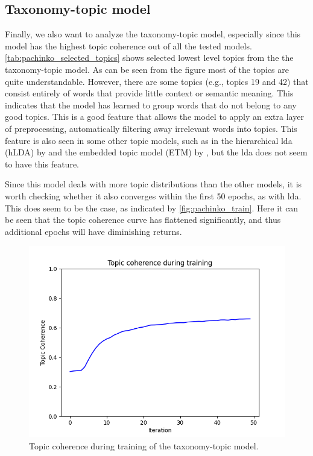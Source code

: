 \subsection{Taxonomy-topic model}\label{sec:taxonomy_analysis}
Finally, we also want to analyze the taxonomy-topic model, especially since this model has the highest topic coherence out of all the tested models.
\autoref{tab:pachinko_selected_topics} shows selected lowest level topics from the the taxonomy-topic model.
As can be seen from the figure most of the topics are quite understandable.
However, there are some topics (e.g., topics 19 and 42) that consist entirely of words that provide little context or semantic meaning.
This indicates that the model has learned to group words that do not belong to any good topics.
This is a good feature that allows the model to apply an extra layer of preprocessing, automatically filtering away irrelevant words into topics.
This feature is also seen in some other topic models, such as in the hierarchical \gls{lda} (hLDA) by \citet{hLDA2004} and the embedded topic model (ETM) by \citet{dieng2020topic}, but the \gls{lda} does not seem to have this feature.

Since this model deals with more topic distributions than the other models, it is worth checking whether it also converges within the first 50 epochs, as with \gls{lda}.
This does seem to be the case, as indicated by \autoref{fig:pachinko_train}.
Here it can be seen that the topic coherence curve has flattened significantly, and thus additional epochs will have diminishing returns.

\begin{figure}
	\centering
	\includegraphics[width= \linewidth]{figures/pachinko_training.PNG}
	\caption{Topic coherence during training of the taxonomy-topic model.}
	\label{fig:pachinko_train}
\end{figure}

